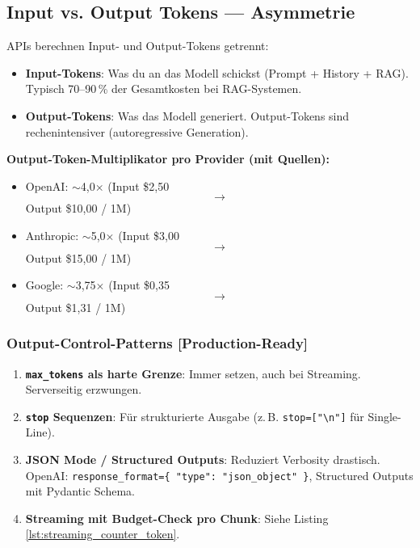 \subsection{Input vs. Output Tokens --- Asymmetrie}
\label{sec:input_output_asymmetry}

APIs berechnen Input- und Output-Tokens getrennt:

\begin{itemize}[leftmargin=*]
  \item \textbf{Input-Tokens}: Was du an das Modell schickst (Prompt + History + RAG). Typisch 70--90\,\% der Gesamtkosten bei RAG-Systemen.
  \item \textbf{Output-Tokens}: Was das Modell generiert. Output-Tokens sind rechenintensiver (autoregressive Generation).
\end{itemize}

\textbf{Output-Token-Multiplikator pro Provider (mit Quellen):}
\begin{itemize}[leftmargin=*]
  \item OpenAI: $\sim$4,0$\times$ (Input \$2,50 $$\to$$ Output \$10,00 / 1M)
  \item Anthropic: $\sim$5,0$\times$ (Input \$3,00 $$\to$$ Output \$15,00 / 1M)
  \item Google: $\sim$3,75$\times$ (Input \$0,35 $$\to$$ Output \$1,31 / 1M)
\end{itemize}


\subsubsection{Output-Control-Patterns [Production-Ready]}
\label{sec:output_control}

\begin{enumerate}[leftmargin=*]
  \item \textbf{\texttt{max\_tokens} als harte Grenze}: Immer setzen, auch bei Streaming. Serverseitig erzwungen.
  \item \textbf{\texttt{stop} Sequenzen}: Für strukturierte Ausgabe (z.\,B. \texttt{stop=["}\texttt{\textbackslash n}\texttt{}\texttt{}\texttt{"]} für Single-Line).
  \item \textbf{JSON Mode / Structured Outputs}: Reduziert Verbosity drastisch. OpenAI: \texttt{response\_format=\{ "type": "json\_object" \}}, Structured Outputs mit Pydantic Schema.
  \item \textbf{Streaming mit Budget-Check pro Chunk}: Siehe Listing \ref{lst:streaming_counter_token}.
\end{enumerate}

